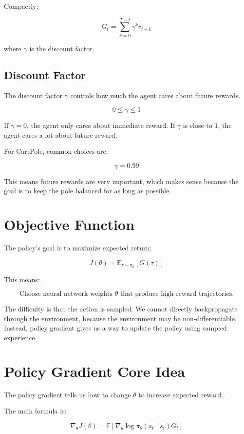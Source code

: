 \documentclass[11pt]{article}
\begin{document}
Compactly:

\[
\boxed{
G_t = \sum_{k=0}^{T-t} \gamma^k r_{t+k}
}
\]

where $\gamma$ is the discount factor.

\subsection{Discount Factor}

The discount factor $\gamma$ controls how much the agent cares about future rewards.

\[
0 \leq \gamma \leq 1
\]

If $\gamma = 0$, the agent only cares about immediate reward.
If $\gamma$ is close to $1$, the agent cares a lot about future reward.

For CartPole, common choices are:

\[
\gamma = 0.99
\]

This means future rewards are very important, which makes sense because the goal is to keep the pole balanced for as long as possible.

\section{Objective Function}

The policy's goal is to maximize expected return:

\[
J(\theta) = \mathbb{E}_{\tau \sim \pi_\theta}[G(\tau)]
\]

This means:

\[
\boxed{
\text{Choose neural network weights } \theta \text{ that produce high-reward trajectories.}
}
\]

The difficulty is that the action is sampled.
We cannot directly backpropagate through the environment, because the environment may be non-differentiable.
Instead, policy gradient gives us a way to update the policy using sampled experience.

\section{Policy Gradient Core Idea}

The policy gradient tells us how to change $\theta$ to increase expected reward.

The main formula is:

\[
\boxed{
\nabla_\theta J(\theta)
= \mathbb{E}\left[
\nabla_\theta \log \pi_\theta(a_t \mid s_t) G_t
\right]
}
\]
\end{document}
